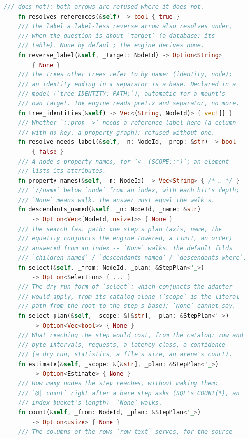 \documentclass{report}
\begin{document}
\begin{lstlisting}[language=rust]
    /// does not): both arrows are refused where it does not.
    fn resolves_references(&self) -> bool { true }
    /// The label a label-less reverse arrow also resolves under,
    /// when the question is about `target` (a database: its
    /// table). None by default; the engine derives none.
    fn reverse_label(&self, _target: NodeId) -> Option<String>
        { None }
    /// The trees other trees refer to by name: (identity, node);
    /// an identity ending in a separator is a base. Declared in a
    /// model (`tree IDENTITY: PATH;`), automatic for a mount's
    /// own target. The engine reads prefix and separator, no more.
    fn tree_identities(&self) -> Vec<(String, NodeId)> { vec![] }
    /// Whether `::prop-->` needs a reference label here (a column
    /// with no key, a property graph): refused without one.
    fn resolve_needs_label(&self, _n: NodeId, _prop: &str) -> bool
        { false }
    /// A node's property names, for `<--(SCOPE::*)`; an element
    /// lists its attributes.
    fn property_names(&self, _n: NodeId) -> Vec<String> { /* … */ }
    /// `//name` below `node` from an index, with each hit's depth;
    /// `None` means walk. The answer must equal the walk's.
    fn descendants_named(&self, _n: NodeId, _name: &str)
        -> Option<Vec<(NodeId, usize)>> { None }
    /// The search fast path: one step's plan (axis, name, the
    /// equality conjuncts the engine lowered, a limit, an order)
    /// answered from an index -- `None` walks. The default folds
    /// `children_named` / `descendants_named` / `descendants_where`.
    fn select(&self, _from: NodeId, _plan: &StepPlan<'_>)
        -> Option<Selection> { ... }
    /// The dry-run form of `select`: which conjuncts the adapter
    /// would apply, from its catalog alone (`scope` is the literal
    /// path from the root to the step's base); `None` cannot say.
    fn select_plan(&self, _scope: &[&str], _plan: &StepPlan<'_>)
        -> Option<Vec<bool>> { None }
    /// What reaching the step would cost, from the catalog: row and
    /// byte intervals, requests, a latency class, a confidence
    /// (a dry run, statistics, a file's size, an arena's count).
    fn estimate(&self, _scope: &[&str], _plan: &StepPlan<'_>)
        -> Option<Estimate> { None }
    /// How many nodes the step reaches, without making them:
    /// `@| count` right after a bare step asks (SQL's COUNT(*), an
    /// index bucket's length). `None` walks.
    fn count(&self, _from: NodeId, _plan: &StepPlan<'_>)
        -> Option<usize> { None }
    /// The columns of the rows `row_text` serves, for the source

\end{lstlisting}
\end{document}
